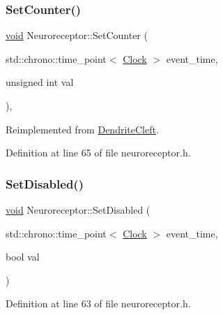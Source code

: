 \subsubsection{\texorpdfstring{Set\+Counter()}{SetCounter()}}
{\footnotesize\ttfamily \mbox{\hyperlink{glad_8h_a950fc91edb4504f62f1c577bf4727c29}{void}} Neuroreceptor\+::\+Set\+Counter (\begin{DoxyParamCaption}\item[{std\+::chrono\+::time\+\_\+point$<$ \mbox{\hyperlink{universe_8h_a0ef8d951d1ca5ab3cfaf7ab4c7a6fd80}{Clock}} $>$}]{event\+\_\+time,  }\item[{unsigned int}]{val }\end{DoxyParamCaption})\hspace{0.3cm}{\ttfamily [inline]}, {\ttfamily [virtual]}}



Reimplemented from \mbox{\hyperlink{class_dendrite_cleft_a428b8e5117f381a382e0071b936d42a1}{Dendrite\+Cleft}}.



Definition at line 65 of file neuroreceptor.\+h.

\mbox{\label{class_neuroreceptor_aeec8bb2442e04700d4e9d80bb2d6e47e}} 
\subsubsection{\texorpdfstring{Set\+Disabled()}{SetDisabled()}}
{\footnotesize\ttfamily \mbox{\hyperlink{glad_8h_a950fc91edb4504f62f1c577bf4727c29}{void}} Neuroreceptor\+::\+Set\+Disabled (\begin{DoxyParamCaption}\item[{std\+::chrono\+::time\+\_\+point$<$ \mbox{\hyperlink{universe_8h_a0ef8d951d1ca5ab3cfaf7ab4c7a6fd80}{Clock}} $>$}]{event\+\_\+time,  }\item[{bool}]{val }\end{DoxyParamCaption})\hspace{0.3cm}{\ttfamily [inline]}}



Definition at line 63 of file neuroreceptor.\+h.

